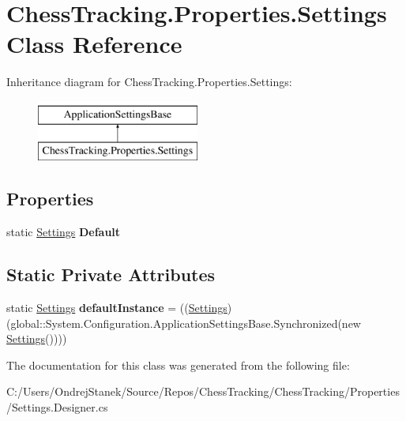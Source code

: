 \hypertarget{class_chess_tracking_1_1_properties_1_1_settings}{}\section{Chess\+Tracking.\+Properties.\+Settings Class Reference}
\label{class_chess_tracking_1_1_properties_1_1_settings}
Inheritance diagram for Chess\+Tracking.\+Properties.\+Settings\+:\begin{figure}[H]
\begin{center}
\leavevmode
\includegraphics[height=2.000000cm]{class_chess_tracking_1_1_properties_1_1_settings}
\end{center}
\end{figure}
\subsection*{Properties}
\begin{DoxyCompactItemize}
\item 
\mbox{\label{class_chess_tracking_1_1_properties_1_1_settings_a81a75294ef0f9fb1f4bf4c4d85c1a5ae}} 
static \mbox{\hyperlink{class_chess_tracking_1_1_properties_1_1_settings}{Settings}} {\bfseries Default}
\end{DoxyCompactItemize}
\subsection*{Static Private Attributes}
\begin{DoxyCompactItemize}
\item 
\mbox{\label{class_chess_tracking_1_1_properties_1_1_settings_a36cf2f568615d775981ff2e91dcf9454}} 
static \mbox{\hyperlink{class_chess_tracking_1_1_properties_1_1_settings}{Settings}} {\bfseries default\+Instance} = ((\mbox{\hyperlink{class_chess_tracking_1_1_properties_1_1_settings}{Settings}})(global\+::\+System.\+Configuration.\+Application\+Settings\+Base.\+Synchronized(new \mbox{\hyperlink{class_chess_tracking_1_1_properties_1_1_settings}{Settings}}())))
\end{DoxyCompactItemize}


The documentation for this class was generated from the following file\+:\begin{DoxyCompactItemize}
\item 
C\+:/\+Users/\+Ondrej\+Stanek/\+Source/\+Repos/\+Chess\+Tracking/\+Chess\+Tracking/\+Properties/Settings.\+Designer.\+cs\end{DoxyCompactItemize}

